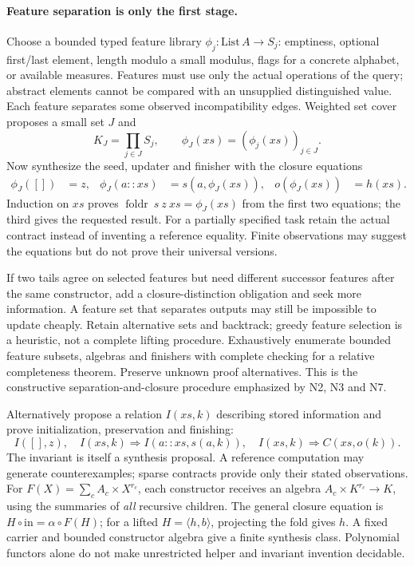 \paragraph{Feature separation is only the first stage.}
Choose a bounded typed feature library $\phi_j:\mathrm{List}\,A\to S_j$:
emptiness, optional first/last element, length modulo a small modulus, flags
for a concrete alphabet, or available measures. Features must use only the
actual operations of the query; abstract elements cannot be compared with an
unsupplied distinguished value. Each feature separates some observed
incompatibility edges. Weighted set cover proposes a small set $J$ and
\[
 K_J=\prod_{j\in J}S_j,\qquad
 \phi_J(xs)=(\phi_j(xs))_{j\in J}.
\]
Now synthesize the seed, updater and finisher with the closure equations
\begin{align}
 \phi_J([])&=z,&
 \phi_J(a::xs)&=s(a,\phi_J(xs)),&
 o(\phi_J(xs))&=h(xs).\label{eq:carrier-feature-closure}
\end{align}
Induction on $xs$ proves $\operatorname{foldr}\ s\ z\ xs=\phi_J(xs)$
from the first two equations; the third gives the requested result. For a
partially specified task retain the actual contract instead of inventing a
reference equality. Finite observations may suggest the equations but do not
prove their universal versions.

If two tails agree on selected features but need different successor features
after the same constructor, add a closure-distinction obligation and seek more
information. A feature set that separates outputs may still be impossible to
update cheaply. Retain alternative sets and backtrack; greedy feature selection
is a heuristic, not a complete lifting procedure. Exhaustively enumerate
bounded feature subsets, algebras and finishers with complete checking for a
relative completeness theorem. Preserve unknown proof alternatives. This is
the constructive separation-and-closure procedure emphasized by N2, N3 and N7.

Alternatively propose a relation $I(xs,k)$ describing stored information and
prove initialization, preservation and finishing:
\[
 I([],z),\quad
 I(xs,k)\Rightarrow I(a::xs,s(a,k)),\quad
 I(xs,k)\Rightarrow C(xs,o(k)).
\]
The invariant is itself a synthesis proposal. A reference computation may
generate counterexamples; sparse contracts provide only their stated
observations. For $F(X)=\sum_c A_c\times X^{r_c}$, each constructor receives
an algebra $A_c\times K^{r_c}\to K$, using the summaries of \emph{all}
recursive children. The general closure equation is
$H\circ\mathrm{in}=\alpha\circ F(H)$; for a lifted
$H=\langle h,b\rangle$, projecting the fold gives $h$. A fixed carrier and
bounded constructor algebra give a finite synthesis class. Polynomial functors
alone do not make unrestricted helper and invariant invention decidable.


